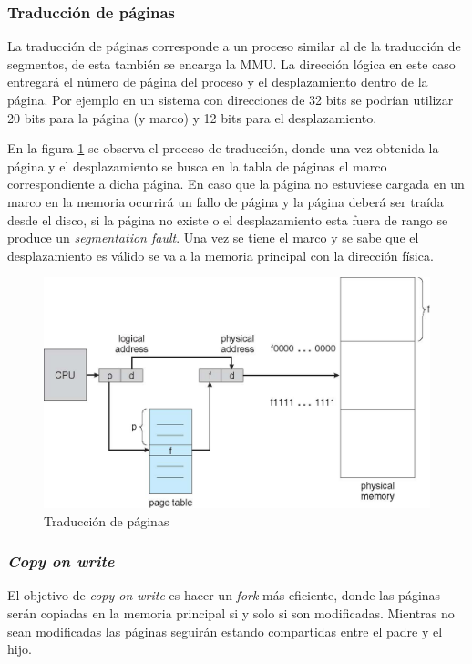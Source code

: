\subsubsection{Traducción de páginas}

La traducción de páginas corresponde a un proceso similar al de la traducción de
segmentos, de esta también se encarga la MMU. La dirección lógica en este caso
entregará el número de página del proceso y el desplazamiento dentro de la
página. Por ejemplo en un sistema con direcciones de 32 bits se podrían utilizar
20 bits para la página (y marco) y 12 bits para el desplazamiento.

En la figura \ref{fig:tabla_paginas} se observa el proceso de traducción, donde
una vez obtenida la página y el desplazamiento se busca en la tabla de páginas
el marco correspondiente a dicha página. En caso que la página no estuviese
cargada en un marco en la memoria ocurrirá un fallo de página y la página deberá
ser traída desde el disco, si la página no existe o el desplazamiento esta fuera
de rango se produce un \textit{segmentation fault}. Una vez se tiene el marco y
se sabe que el desplazamiento es válido se va a la memoria principal con la
dirección física.

\begin{figure}[htbp]
\centering
\includegraphics[scale=.9]{img/C07_memoria/tabla_paginas.jpg}
\caption{Traducción de páginas}
\label{fig:tabla_paginas}
\end{figure}

\subsubsection{\textit{Copy on write}}

El objetivo de \textit{copy on write} es hacer un \textit{fork} más eficiente,
donde las páginas serán copiadas en la memoria principal si y solo si son
modificadas. Mientras no sean modificadas las páginas seguirán estando
compartidas entre el padre y el hijo.

